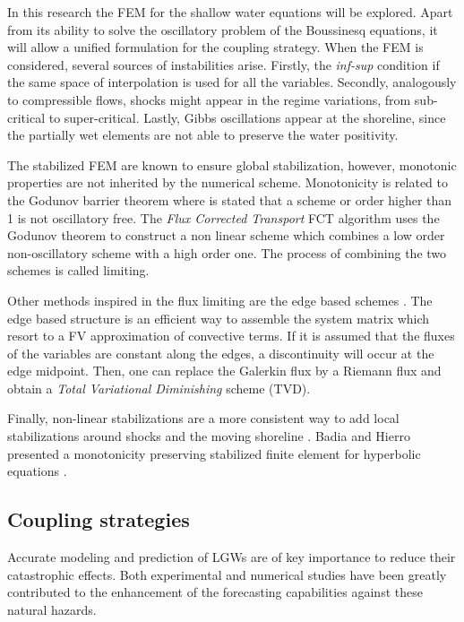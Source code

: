 In this research the FEM for the shallow water equations will be explored. Apart from its ability to solve the oscillatory problem of the Boussinesq equations, it will allow a unified formulation for the coupling strategy. When the FEM is considered, several sources of instabilities arise. Firstly, the \emph{inf-sup} condition if the same space of interpolation is used for all the variables. Secondly, analogously to compressible flows, shocks might appear in the regime variations, from sub-critical to super-critical. Lastly, Gibbs oscillations appear at the shoreline, since the partially wet elements are not able to preserve the water positivity.

The stabilized FEM are known to ensure global stabilization, however, monotonic properties are not inherited by the numerical scheme. Monotonicity is related to the Godunov barrier theorem \cite{godunov1959} where is stated that a scheme or order higher than 1 is not oscillatory free. The \emph{Flux Corrected Transport} FCT algorithm \cite{lohner2008ch9} uses the Godunov theorem to construct a non linear scheme which combines a low order non-oscillatory scheme with a high order one. The process of combining the two schemes is called limiting.

Other methods inspired in the flux limiting are the edge based schemes \cite{lohner2008ch10}. The edge based structure is an efficient way to assemble the system matrix which resort to a FV approximation of convective terms. If it is assumed that the fluxes of the variables are constant along the edges, a discontinuity will occur at the edge midpoint. Then, one can replace the Galerkin flux by a Riemann flux and obtain a \emph{Total Variational Diminishing} scheme (TVD).

Finally, non-linear stabilizations are a more consistent way to add local stabilizations around shocks and the moving shoreline \cite{codina2011}. Badia and Hierro presented a monotonicity preserving stabilized finite element for hyperbolic equations \cite{badia2014}.



\subsection{Coupling strategies}


Accurate modeling and prediction of LGWs are of key importance to reduce their catastrophic effects.
Both experimental and numerical studies have been greatly contributed to the enhancement of the forecasting capabilities against these natural hazards.

